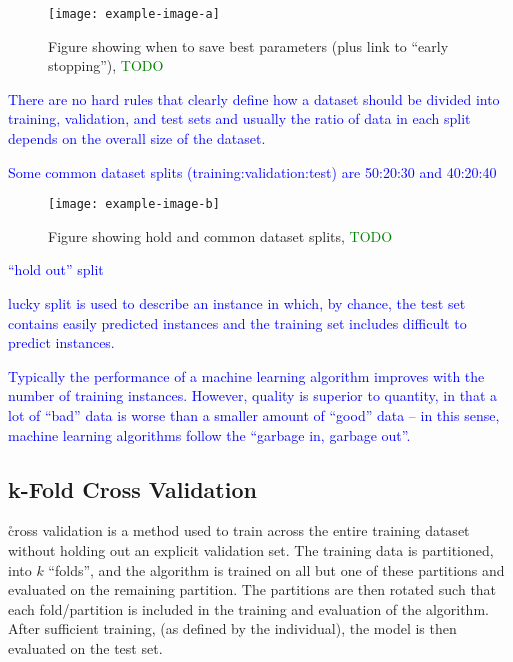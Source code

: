 \begin{figure}[htp]
	\centering
	\texttt{[image: example-image-a]}\hfil
	\caption{Figure showing when to save best parameters (plus link to ``early stopping''), \textcolor{green}{TODO}}
	\label{fig:sample_split_save_best_params}
\end{figure}

\textcolor{blue}{There are no hard rules that clearly define how a dataset should be divided into training, validation, and test sets and usually the ratio of data in each split depends on the overall size of the dataset.}

\textcolor{blue}{Some common dataset splits (training:validation:test) are 50:20:30 and 40:20:40}

\begin{figure}[htp]
	\centering
	\texttt{[image: example-image-b]}\hfil
	\caption{Figure showing hold and common dataset splits, \textcolor{green}{TODO}}
	\label{fig:sample_split_hold_out}
\end{figure}

\textcolor{blue}{``hold out'' split}

\textcolor{blue}{{lucky split} is used to describe an instance in which, by chance, the test set contains easily predicted instances and the training set includes difficult to predict instances.}

\textcolor{blue}{Typically the performance of a machine learning algorithm improves with the number of training instances. However, quality is superior to quantity, in that a lot of ``bad'' data is worse than a smaller amount of ``good'' data -- in this sense, machine learning algorithms follow the ``garbage in, garbage out''.}



\subsection{k-Fold Cross Validation}

\r{cross validation is a method used to train across the entire training dataset without holding out an explicit validation set. The training data is partitioned, into $k$ ``folds'', and the algorithm is trained on all but one of these partitions and evaluated on the remaining partition. The partitions are then rotated such that each fold/partition is included in the training and evaluation of the algorithm. After sufficient training, (as defined by the individual), the model is then evaluated on the test set.}

